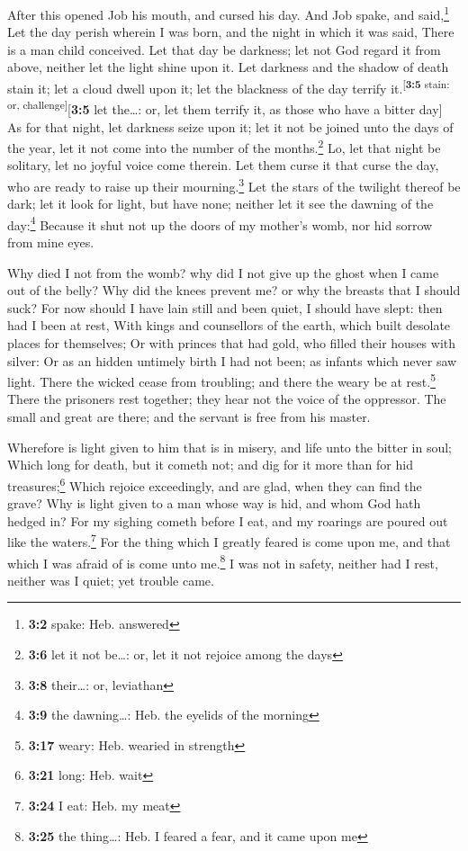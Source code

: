  After this opened Job his mouth, and cursed his day.
 And Job spake, and said,\footnote{\textbf{3:2} spake:
  Heb. answered}  Let the day perish wherein I was born,
and the night in which it was said, There is a man child conceived.
 Let that day be darkness; let not God regard it from
above, neither let the light shine upon it.  Let darkness
and the shadow of death stain it; let a cloud dwell upon it; let the
blackness of the day terrify it.\textsuperscript{{[}\textbf{3:5} stain:
or, challenge{]}}{[}\textbf{3:5} let the\ldots: or, let them terrify it,
as those who have a bitter day{]}  As for that night, let
darkness seize upon it; let it not be joined unto the days of the year,
let it not come into the number of the months.\footnote{\textbf{3:6} let
  it not be\ldots: or, let it not rejoice among the days} 
Lo, let that night be solitary, let no joyful voice come therein.
 Let them curse it that curse the day, who are ready to
raise up their mourning.\footnote{\textbf{3:8} their\ldots: or,
  leviathan}  Let the stars of the twilight thereof be
dark; let it look for light, but have none; neither let it see the
dawning of the day:\footnote{\textbf{3:9} the dawning\ldots: Heb. the
  eyelids of the morning}  Because it shut not up the
doors of my mother's womb, nor hid sorrow from mine eyes.

 Why died I not from the womb? why did I not give up the
ghost when I came out of the belly?  Why did the knees
prevent me? or why the breasts that I should suck?  For
now should I have lain still and been quiet, I should have slept: then
had I been at rest,  With kings and counsellors of the
earth, which built desolate places for themselves;  Or
with princes that had gold, who filled their houses with silver:
 Or as an hidden untimely birth I had not been; as
infants which never saw light.  There the wicked cease
from troubling; and there the weary be at rest.\footnote{\textbf{3:17}
  weary: Heb. wearied in strength}  There the prisoners
rest together; they hear not the voice of the oppressor. 
The small and great are there; and the servant is free from his master.

 Wherefore is light given to him that is in misery, and
life unto the bitter in soul;  Which long for death, but
it cometh not; and dig for it more than for hid treasures;\footnote{\textbf{3:21}
  long: Heb. wait}  Which rejoice exceedingly, and are
glad, when they can find the grave?  Why is light given
to a man whose way is hid, and whom God hath hedged in? 
For my sighing cometh before I eat, and my roarings are poured out like
the waters.\footnote{\textbf{3:24} I eat: Heb. my meat} 
For the thing which I greatly feared is come upon me, and that which I
was afraid of is come unto me.\footnote{\textbf{3:25} the thing\ldots:
  Heb. I feared a fear, and it came upon me}  I was not
in safety, neither had I rest, neither was I quiet; yet trouble came.

